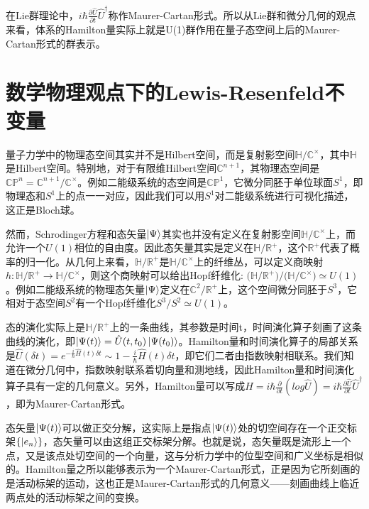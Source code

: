 \documentclass[a4paper]{article}
\begin{document}
        在Lie群理论中，$i\hbar\frac{\partial\hat{U}}{\partial t}\hat{U}^\dagger$称作Maurer-Cartan形式。所以从Lie群和微分几何的观点来看，体系的Hamilton量实际上就是U(1)群作用在量子态空间上后的Maurer-Cartan形式的群表示。



    \section{数学物理观点下的Lewis-Resenfeld不变量}

        量子力学中的物理态空间其实并不是Hilbert空间，而是复射影空间$\mathbb{H}/\mathbb{C}^\times$，其中$\mathbb{H}$是Hilbert空间。特别地，对于有限维Hilbert空间$\mathbb{C}^{n+1}$，其物理态空间是$\mathbb{CP}^n=\mathbb{C}^{n+1}/\mathbb{C}^\times$。例如二能级系统的态空间是$\mathbb{CP}^1$，它微分同胚于单位球面$S^1$，即物理态和$S^1$上的点一一对应，因此我们可以用$S^1$对二能级系统进行可视化描述，这正是Bloch球。
    
        然而，Schrodinger方程和态矢量$\ket{\Psi}$其实也并没有定义在复射影空间$\mathbb{H}/\mathbb{C}^\times$上，而允许一个$U(1)$相位的自由度。因此态矢量其实是定义在$\mathbb{H}/\mathbb{R}^+$，这个$\mathbb{R}^+$代表了概率的归一化。从几何上来看，$\mathbb{H}/\mathbb{R}^+$是$\mathbb{H}/\mathbb{C}^\times$上的纤维丛，可以定义商映射$h:\mathbb{H}/\mathbb{R}^+\to\mathbb{H}/\mathbb{C}^\times$，则这个商映射可以给出Hopf纤维化: $\bigl(\mathbb{H}/\mathbb{R}^+\bigr) / \bigl(\mathbb{H}/\mathbb{C}^\times\bigr) \simeq U(1)$。例如二能级系统的物理态矢量$\ket{\Psi}$定义在$\mathbb{C}^2/\mathbb{R}^+$上，这个空间微分同胚于$S^3$，它相对于态空间$S^2$有一个Hopf纤维化$S^3/S^2\simeq U(1)$。
        
        态的演化实际上是$\mathbb{H}/\mathbb{R}^+$上的一条曲线，其参数是时间t，时间演化算子刻画了这条曲线的演化，即$\ket{\Psi(t)}=\hat{U}(t,t_0)\ket{\Psi(t_0)}$。Hamilton量和时间演化算子的局部关系是$\hat{U}(\delta t) = e^{-\frac{i}{\hbar}\hat{H}(t)\delta t}\sim 1-\frac{i}{\hbar}\hat{H}(t)\delta t$，即它们二者由指数映射相联系。我们知道在微分几何中，指数映射联系着切向量和测地线，因此Hamilton量和时间演化算子具有一定的几何意义。另外，Hamilton量可以写成$\hat{H}=i\hbar\frac{\partial}{\partial t}(log\hat{U})=i\hbar\frac{\partial\hat{U}}{\partial t}\hat{U}^\dagger$，即为Maurer-Cartan形式。

        态矢量$\ket{\Psi(t)}$可以做正交分解，这实际上是指点$\ket{\Psi(t)}$处的切空间存在一个正交标架$\{\ket{e_n}\}$，态矢量可以由这组正交标架分解。也就是说，态矢量既是流形上一个点，又是该点处切空间的一个向量，这与分析力学中的位型空间和广义坐标是相似的。Hamilton量之所以能够表示为一个Maurer-Cartan形式，正是因为它所刻画的是活动标架的运动，这也正是Maurer-Cartan形式的几何意义——刻画曲线上临近两点处的活动标架之间的变换。
\end{document}
